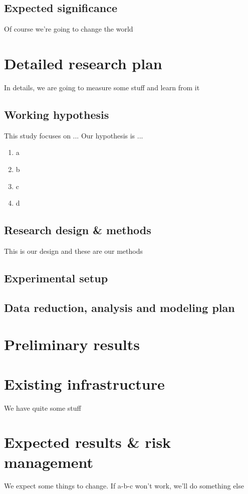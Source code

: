 \documentclass[11pt]{article}
\begin{document}
\subsection*{Expected significance}

Of course we're going to change the world

\section*{Detailed research plan}

In details, we are going to measure some stuff and learn from it



\subsection*{Working hypothesis}

This study focuses on ... Our hypothesis is ...
\begin{enumerate}
    \item a
    \item b
    \item c
    \item d
\end{enumerate}


\subsection*{Research design \& methods}

This is our design and these are our methods

\subsection*{Experimental setup}


\subsection*{Data reduction, analysis and modeling plan}


\section*{Preliminary results}



\section*{Existing infrastructure}

We have quite some stuff

\section*{Expected results \& risk management}

We expect some things to change. If a-b-c won't work, we'll do something else
 
\clearpage
\printbibliography
\end{document}
